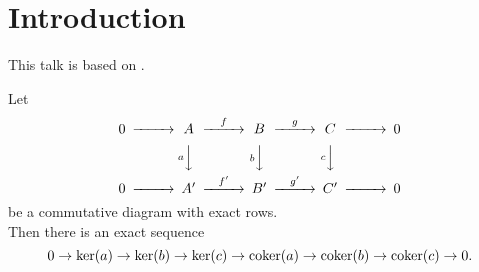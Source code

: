 \section{Introduction}
This talk is based on \cite{Wei94}.

\begin{note}\label{snake_lemma}
	Let
	\begin{align*}
		\begin{CD}
			0 @>>> A @>f>> B @>g>> C @>>> 0 \\
			@.   @VaVV   @VbVV    @VcVV    @. \\
			0 @>>> A' @>f'>> B' @>g'>> C' @>>> 0
		\end{CD}
	\end{align*}
	be a commutative diagram with exact rows. \\
	Then there is an exact sequence
	$$0 \rightarrow \ker(a) \rightarrow \ker(b) \rightarrow \ker(c) \rightarrow \operatorname{coker}(a) \rightarrow \operatorname{coker}(b) \rightarrow \operatorname{coker}(c) \rightarrow 0.$$
\end{note}